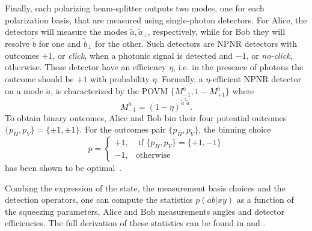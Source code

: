 Finally, each polarizing beam-splitter outputs two modes, one for each polarization basis, that are measured using single-photon detectors.
For Alice, the detectors will measure the modes $\tilde{a},\tilde{a}_\perp$, respectively, while for Bob they will resolve $\tilde{b}$ for one and $\tilde{b}_\perp$ for the other.
Such detectors are \acrfull{NPNR} detectors with outcomes $+1$, or \textit{click}, when a photonic signal is detected and $-1$, or \textit{no-click}, otherwise.
These detector have an efficiency $\eta$, i.e. in the presence of photons the outcome should be $+1$ with probability $\eta$.
Formally, a $\eta$-efficient NPNR detector on a mode $\tilde{a}$, is characterized by the POVM $\{M_{-1}^{\tilde{a}},1-M_{+1}^{\tilde{a}}\}$ where
\begin{equation}
	M_{-1}^{\tilde{a}} = (1-\eta)^{\tilde{a}^\dag\tilde{a}}.
\end{equation}
To obtain binary outcomes, Alice and Bob bin their four potential outcomes $\{p_H,p_V\}=\{\pm1,\pm1\}$.
For the outcomes pair $\{p_H,p_V\}$, the binning choice
\begin{equation}
	p=\begin{cases}
		+1, &\text{ if } \{p_H,p_V\}=\{+1,-1\}\\
		-1, &\text{otherwise}
	\end{cases}
\end{equation}
has been shown to be optimal~\cite{Vivoli2015b}.

Combing the expression of the state, the measurement basis choices and the detection operators, one can compute the statistics $p(ab|xy)$ as a function of the squeezing parameters, Alice and Bob measurements angles and detector efficiencies.
The full derivation of these statistics can be found in \cite{Vivoli2015b} and \cite{Ho2020}.

\medbreak

